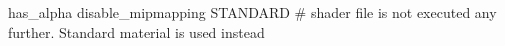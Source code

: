 has_alpha
disable_mipmapping
STANDARD     # shader file is not executed any further. Standard material is used instead


